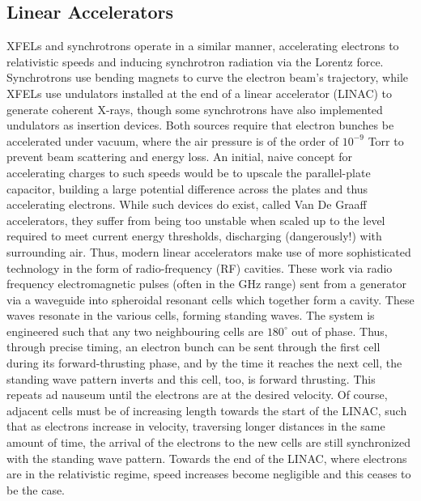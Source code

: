 \documentclass[aps,prb,twocolumn,superscriptaddress]{revtex4-2}
\begin{document}
\subsection{Linear Accelerators}
XFELs and synchrotrons operate in a similar manner, accelerating electrons to
relativistic speeds and inducing synchrotron radiation via the Lorentz force.
Synchrotrons use bending magnets to curve the electron beam's trajectory, while
XFELs use undulators installed at the end of a linear accelerator (LINAC) to
generate coherent X-rays, though some synchrotrons have also implemented
undulators as insertion devices. Both sources require that electron bunches be
accelerated under vacuum, where the air pressure is of the order of $10^{-9}$
Torr to prevent beam scattering and energy loss. An initial, naive concept for
accelerating charges to such speeds would be to upscale the parallel-plate
capacitor, building a large potential difference across the plates and thus
accelerating electrons. While such devices do exist, called Van De Graaff
accelerators, they suffer from being too unstable when scaled up to the level
required to meet current energy thresholds, discharging (dangerously!) with
surrounding air. Thus, modern linear accelerators make use of more
sophisticated technology in the form of radio-frequency (RF) cavities. These
work via radio frequency electromagnetic pulses (often in the GHz range) sent
from a generator via a waveguide into spheroidal resonant cells which together
form a cavity. These waves resonate in the various cells, forming standing
waves. The system is engineered such that any two neighbouring cells are
$180^\circ$ out of phase. Thus, through precise timing, an electron bunch can
be sent through the first cell during its forward-thrusting phase, and by the
time it reaches the next cell, the standing wave pattern inverts and this cell,
too, is forward thrusting. This repeats ad nauseum until the electrons are at
the desired velocity. Of course, adjacent cells must be of increasing length
towards the start of the LINAC, such that as electrons increase in velocity,
traversing longer distances in the same amount of time, the arrival of the
electrons to the new cells are still synchronized with the standing wave
pattern. Towards the end of the LINAC, where electrons are in the relativistic
regime, speed increases become negligible and this ceases to be the case. 
\end{document}
